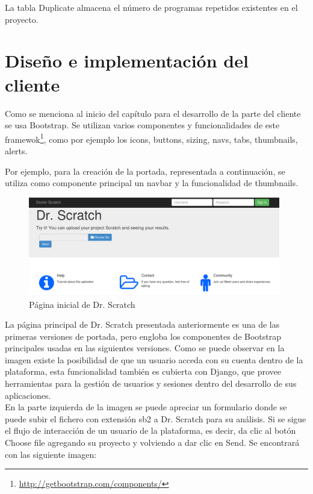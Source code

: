 \documentclass[a4paper, 12pt]{book}
\begin{document}
La tabla Duplicate almacena el número de programas repetidos existentes en el proyecto.


\section{Diseño e implementación del cliente}
\label{sec:servidor}

Como se menciona al inicio del capítulo para el desarrollo de la parte del cliente se usa
Bootstrap. Se utilizan varios componentes y funcionalidades de este
 framewok\footnote{\url{http://getbootstrap.com/components/}}, como por ejemplo los icons,
buttons, sizing, navs, tabs, thumbnails, alerts.

Por ejemplo, para la creación de la portada, representada a continuación, se utiliza como
componente principal un navbar y la funcionalidad de thumbnails.

 \begin{figure}
		\graphicspath{{img/}}
    \includegraphics[bb=0 0 800 600, width=11cm, keepaspectratio]{portada.png}
		\caption{Página inicial de Dr. Scratch}
    \label{figura:foro_hilos}
 \end{figure} 

La página principal de Dr. Scratch presentada anteriormente es una de las primeras 
versiones de portada, pero engloba los componentes de Bootstrap principales 
usadas en las siguientes versiones. Como se puede observar en la imagen existe la 
posibilidad de que un usuario acceda con su cuenta dentro de la plataforma, esta
funcionalidad también es cubierta con Django, que provee herramientas para la 
gestión de usuarios y sesiones dentro del desarrollo de sus aplicaciones. \\

En la parte izquierda de la imagen se puede apreciar un formulario donde se puede
subir el fichero con extensión sb2 a Dr. Scratch para su análisis. Si se sigue el
flujo de interacción de un usuario de la plataforma, es decir, da clic al botón
 Choose file agregando su proyecto y volviendo a dar clic en Send. Se encontrará 
con las siguiente imagen:
\end{document}
